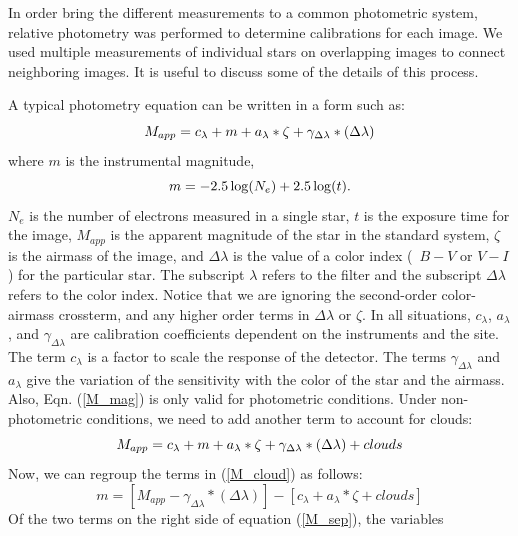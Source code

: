 \documentclass{article}
\begin{document}
In order bring the different measurements to a common photometric
system, relative photometry was performed to determine calibrations
for each image.  We used multiple measurements of individual stars on
overlapping images to connect neighboring images.  It is useful to
discuss some of the details of this process.  

A typical photometry equation can be written in a form such as:
\begin{equation}        
M_{app} = c_{\lambda} + m + a_{\lambda}*\zeta + \gamma_{\Delta\lambda}*(\Delta\lambda) \\
\label{M_mag}
\end{equation}
where $m$ is the instrumental magnitude,
\begin{equation}        
m = -2.5\log(N_{e}) + 2.5\log(t). \\
\label{inst_mag}
\end{equation}
$N_{e}$ is the number of electrons measured in a single star, $t$ is
the exposure time for the image, $M_{app}$ is the apparent magnitude
of the star in the standard system, $\zeta$ is the airmass of the
image, and $\Delta\lambda$ is the value of a color index (\ie\ $B-V$
or $V-I$) for the particular star.  The subscript $\lambda$ refers to
the filter and the subscript $\Delta\lambda$ refers to the color
index.  Notice that we are ignoring the second-order color-airmass
crossterm, and any higher order terms in $\Delta\lambda$ or $\zeta$.
In all situations, $c_{\lambda}$, $a_{\lambda}$, and
$\gamma_{\Delta\lambda}$ are calibration coefficients dependent on the
instruments and the site.  The term $c_{\lambda}$ is a factor to scale
the response of the detector.  The terms $\gamma_{\Delta\lambda}$ and
$a_{\lambda}$ give the variation of the sensitivity with the color of
the star and the airmass.  Also, Eqn. (\ref{M_mag}) is only valid for
photometric conditions.  Under non-photometric conditions, we need to
add another term to account for clouds:
\begin{equation}        
M_{app} = c_{\lambda} + m + a_{\lambda}*\zeta + \gamma_{\Delta\lambda}*(\Delta\lambda) + clouds \\
\label{M_cloud}
\end{equation}
Now, we can regroup the terms in (\ref{M_cloud}) as follows:
\begin{equation}        
m = [M_{app} - \gamma_{\Delta\lambda}*(\Delta\lambda)] - [c_{\lambda} + a_{\lambda}*\zeta + clouds]
\label{M_sep}
\end{equation}
Of the two terms on the right side of equation (\ref{M_sep}), the variables
\end{document}
